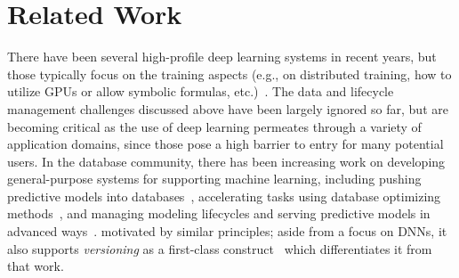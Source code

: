 \documentclass[conference]{IEEEtran}
\begin{document}
\section{Related Work}
\label{sec:related_work}


There have been several high-profile deep learning systems in recent years, but those typically focus on the training aspects (e.g., on distributed training, how to utilize GPUs or allow symbolic formulas, etc.)~\cite{caffe2014mm,tensorflow,distbelief2012nips,adam14osdi,singa2015mm}. %
The data and lifecycle management challenges discussed above have been largely ignored so far, but are becoming critical as the use of deep learning permeates through a variety of application domains, since those pose a high barrier to entry for many potential users.
In the database community, there has been increasing work on developing general-purpose systems for supporting machine learning, including pushing predictive models into databases~\cite{brown11cidr,madlib2012sigmod},
   accelerating tasks using database optimizing methods~\cite{ce2014sigmod,arun2015sigmod}, %
and managing modeling lifecycles and serving predictive models in advanced ways~\cite{madden15learningsys,franklin2015learningsys}.  %
\modelhub\is motivated by similar principles; aside from a focus on DNNs, it also supports {\em versioning} as a first-class construct~\cite{datahub} which differentiates it from that work.
\end{document}
